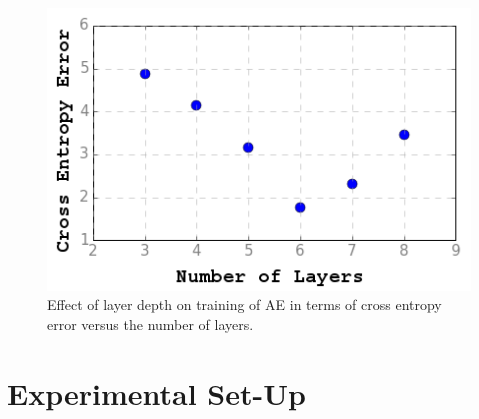 \begin{figure}
\centering
\includegraphics[width=0.6\columnwidth]{Figures/layers}
\caption{Effect of layer depth on training of AE in terms of cross entropy error versus the number of layers.}
\label{fig:layerplot}
\end{figure}




\section{Experimental Set-Up}
\label{sec:expt_cathay312}

